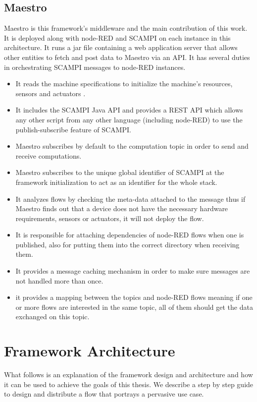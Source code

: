 \subsection{Maestro}
Maestro  is this framework's middleware and the main contribution of this work. It is deployed along with node-RED and SCAMPI on each instance in this architecture. It runs a jar file containing a web application  server that allows other entities to fetch and post data to Maestro via an API. It has several duties in orchestrating  SCAMPI messages to node-RED instances.
\begin{itemize}
\item It reads the machine specifications to initialize the machine's resources, sensors and actuators 	.
\item It includes the SCAMPI Java API and provides a REST API which allows any other script from any other language (including node-RED) to use the publish-subscribe feature of SCAMPI.
\item Maestro subscribes by default to the computation topic in order to  send and receive computations.
\item Maestro subscribes to the unique global identifier of SCAMPI at the framework initialization to act as an identifier for the whole stack.

\item It analyzes  flows by checking the meta-data  attached to the message thus if Maestro finds out that a device does not have the necessary hardware requirements, sensors or actuators, it will not deploy the flow. 
\item It is responsible for attaching dependencies of  node-RED flows when one is published, also for putting them into the correct directory when receiving them.
\item It provides a message caching mechanism in order to make sure messages are not handled more than once.
\item it provides a mapping between the topics and node-RED flows meaning if one or more flows are interested in the same topic, all of them should get the data exchanged on this topic.
 \end{itemize}

\section{Framework Architecture} \label{sec:arhcitecture}
What follows is an explanation of the framework design and architecture and how it can be used to achieve the goals of this thesis. We describe a step by step guide to design and distribute a flow that portrays a pervasive use case.


